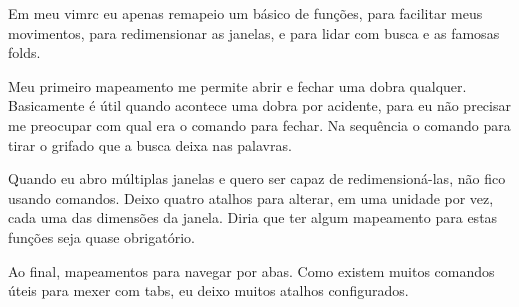Em meu vimrc eu apenas remapeio um básico de funções, para facilitar meus movimentos,
para redimensionar as janelas, e para lidar com busca e as famosas folds.


Meu primeiro mapeamento  me permite
abrir e fechar uma dobra qualquer.
Basicamente é útil quando acontece uma dobra por acidente, para eu não precisar me preocupar com
qual era o comando para fechar.
Na sequência o comando para tirar o grifado que a busca deixa nas palavras.

Quando eu abro múltiplas janelas e quero ser capaz de redimensioná-las, não fico usando comandos.
Deixo quatro atalhos para alterar, em uma unidade por vez, cada uma das dimensões da janela.
Diria que ter algum mapeamento para estas funções seja quase obrigatório.


Ao final, mapeamentos para navegar por abas.
Como existem muitos comandos úteis para mexer com tabs, eu deixo muitos
atalhos configurados.

\newpage
